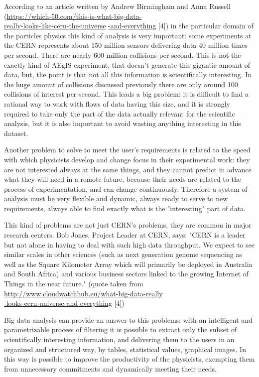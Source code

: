 According to an article written by Andrew Birmingham and Anna Russell (\url{https://which-50.com/this-is-what-big-data-}	\\ \url{really-looks-like-cern-the-universe} 	\url{-and-everything} [4]) in the particular domain of the particles physics this kind of analysis is very important: some experiments at the CERN represents about 150 million sensors delivering data 40 million times per second. There are nearly 600 million collisions per second. This is not the exactly kind of AEgIS experiment, that doesn't generate this gigantic amount of data, but, the point is that not all this information is scientifically interesting. In the huge amount of collisions discussed previously there are only around 100 collisions of interest per second.
This leads a big problem: it is difficult to find a rational way to work with flows of data having this size, and it is strongly required to take only the part of the data actually relevant for the scientific analysis, but it is also important to avoid wasting anything interesting in this dataset.

Another problem to solve to meet the user's requirements is related to the speed with which physicists develop and change focus in their experimental work: they are not interested always at the same things, and they cannot predict in advance what they will need in a remote future, because their needs are related to the process of experimentation, and can change continuously. 
Therefore a system of analysis must be very flexible and dynamic, always ready to serve to new requirements, always able to find exactly what is the "interesting" part of data.  

This kind of problems are not just CERN's problems, they are common in major research centers. Bob Jones, Project Leader at CERN, says:
"CERN is a leader but not alone in having to deal with such high data throughput. We expect to see similar scales in other sciences (such as next generation genome sequencing as well as the Square Kilometer Array which will primarily be deployed in Australia and South Africa) and various business sectors linked to the growing Internet of Things in the near future."
(quote taken from \url{http://www.cloudwatchhub.eu/what-big-data-really}	\\ \url{-looks-cern-universe-and-everything} [4])
 
Big data analysis can provide an answer to this problems: with an intelligent and parametrizable process of filtering it is possible to extract only the subset of scientifically interesting information, and delivering them to the users in an organized and structured way, by tables, statistical values, graphical images. 
In this way is possible to improve the productivity of the physicists, exempting them from unnecessary commitments and dynamically meeting their needs. 


